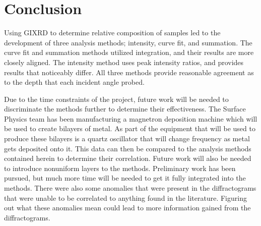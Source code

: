 \chapter{Conclusion}

    Using GIXRD to determine relative composition of samples led to the development of three analysis methods; intensity, curve fit, and summation. 
    The curve fit and summation methods utilized integration, and their results are more closely aligned. 
    The intensity method uses peak intensity ratios, and provides results that noticeably differ. 
    All three methods provide reasonable agreement as to the depth that each incident angle probed. 
    
    Due to the time constraints of the project, future work will be needed to discriminate the methods further to determine their effectiveness. 
    The Surface Physics team has been manufacturing a magnetron deposition machine which will be used to create bilayers of metal. 
    As part of the equipment that will be used to produce these bilayers is a quartz oscillator that will change frequency as metal gets deposited onto it. 
    This data can then be compared to the analysis methods contained herein to determine their correlation. 
    Future work will also be needed to introduce nonuniform layers to the methods. 
    Preliminary work has been pursued, but much more time will be needed to get it fully integrated into the methods. 
    There were also some anomalies that were present in the diffractograms that were unable to be correlated to anything found in the literature. 
    Figuring out what these anomalies mean could lead to more information gained from the diffractograms. 
    


    
